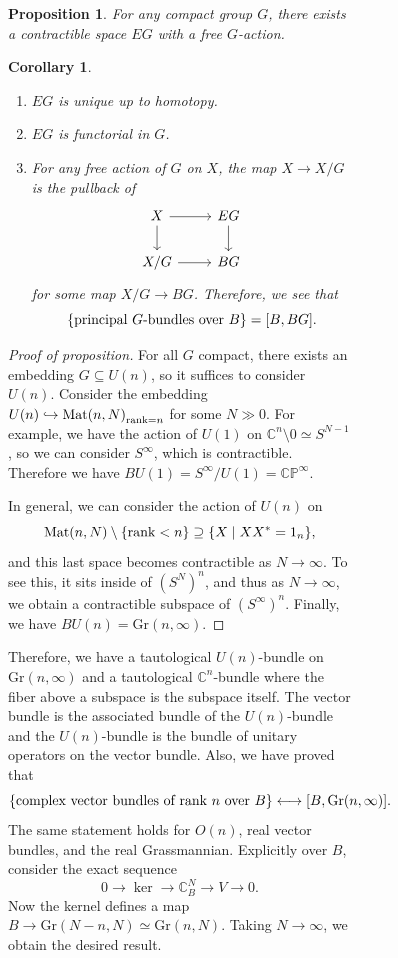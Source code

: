 \documentclass[leqno, openany]{memoir}
\newtheorem{cor}[thm]{Corollary}
\newtheorem{prop}[thm]{Proposition}
\theoremstyle{definition}
\theoremstyle{remark}
\theoremstyle{plain}
\theoremstyle{definition}
\theoremstyle{remark}
\newcommand{\C}{\mathbb{C}}
\renewcommand{\P}{\mathbb{P}}
\newcommand{\mr}[1]{\mathrm{#1}}
\begin{document}
\begin{figure}[H]
\begin{figure}[H]
\begin{prop} For any compact group $G$, there exists a contractible space $EG$
with a free $G$-action.  \end{prop}

\begin{cor}\leavevmode \begin{enumerate} \item $EG$ is unique up to homotopy.
    \item $EG$ is functorial in $G$.  \item For any free action of $G$ on $X$,
        the map $X \to X/G$ is the pullback of \begin{equation*} \begin{tikzcd}
            X \ar{r} \ar{d} & EG \ar{d} \\ X/G \ar{r} & BG \end{tikzcd}
        \end{equation*} for some map $X/G \to BG$. Therefore, we see that \[
\qty{\text{principal $G$-bundles over $B$}} = [B, BG]. \] \end{enumerate}
\end{cor}

\begin{proof}[Proof of proposition] For all $G$ compact, there exists an
    embedding $G \subseteq U(n)$, so it suffices to consider $U(n)$. Consider
    the embedding $U(n) \hookrightarrow { \mr{Mat}(n, N) }_{\rank = n}$ for
    some $N \gg 0$. For example, we have the action of $U(1)$ on $\C^n
    \setminus 0 \simeq S^{N-1}$, so we can consider $S^{\infty}$, which is
    contractible. Therefore we have $BU(1) = S^{\infty} / U(1) =
    \C\P^{\infty}$.

    In general, we can consider the action of $U(n)$ on \[ \mr{Mat}(n, N)
    \setminus \qty{\rank < n} \supseteq \qty{X \mid XX^* = 1_n}, \] and this
    last space becomes contractible as $N \to \infty$. To see this, it sits
    inside of ${(S^N)}^n$, and thus as $N \to \infty$, we obtain a contractible
    subspace of ${(S^{\infty})}^n$. Finally, we have $BU(n) = \mr{Gr}(n,
    \infty)$.  \end{proof}

Therefore, we have a tautological $U(n)$-bundle on $\mr{Gr}(n, \infty)$ and a
tautological $\C^n$-bundle where the fiber above a subspace is the subspace
itself. The vector bundle is the associated bundle of the $U(n)$-bundle and the
$U(n)$-bundle is the bundle of unitary operators on the vector bundle. Also, we
have proved that \[ \qty{\text{complex vector bundles of rank $n$ over $B$}}
\longleftrightarrow [B, \mr{Gr}(n, \infty)]. \] The same statement holds for
$O(n)$, real vector bundles, and the real Grassmannian. Explicitly over $B$,
consider the exact sequence \[ 0 \to \ker \to \C^N_B \to V \to 0. \] Now the
kernel defines a map $B \to \mr{Gr}(N - n, N) \simeq \mr{Gr}(n, N)$. Taking $N
\to \infty$, we obtain the desired result.


\end{figure}
\end{figure}
\end{document}
